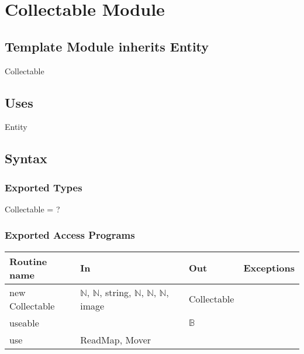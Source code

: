 \documentclass[12pt]{article}
\newcommand{\m}[1]{\mbox{#1}}
\begin{document}



\newpage

\section*{Collectable Module}

\subsection*{Template Module inherits Entity}

Collectable

\subsection*{Uses}

Entity

\subsection*{Syntax}

\subsubsection*{Exported Types}

Collectable = ?

\subsubsection*{Exported Access Programs}

\begin{tabular}{| l | l | l | l |}
\hline
\textbf{Routine name} & \textbf{In} & \textbf{Out} & \textbf{Exceptions}\\
\hline
new Collectable & $\mathbb{N}$, $\mathbb{N}$, string, $\mathbb{N}$, $\mathbb{N}$, $\mathbb{N}$, image & Collectable & ~\\
\hline
useable & ~ & $\mathbb{B}$ & ~\\
\hline
use & ReadMap, Mover & ~ & ~\\
\hline
\end{tabular}
\end{document}
